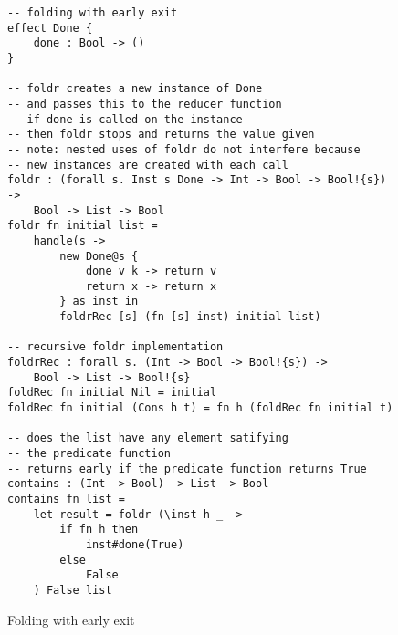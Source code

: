 \begin{figure}[h]
\caption{Folding with early exit}
\begin{verbatim}
-- folding with early exit
effect Done {
	done : Bool -> ()
}

-- foldr creates a new instance of Done
-- and passes this to the reducer function
-- if done is called on the instance
-- then foldr stops and returns the value given
-- note: nested uses of foldr do not interfere because
-- new instances are created with each call
foldr : (forall s. Inst s Done -> Int -> Bool -> Bool!{s}) ->
	Bool -> List -> Bool
foldr fn initial list =
	handle(s ->
		new Done@s {
			done v k -> return v
			return x -> return x
		} as inst in
		foldrRec [s] (fn [s] inst) initial list)

-- recursive foldr implementation
foldrRec : forall s. (Int -> Bool -> Bool!{s}) ->
	Bool -> List -> Bool!{s}
foldRec fn initial Nil = initial
foldRec fn initial (Cons h t) = fn h (foldRec fn initial t)

-- does the list have any element satifying
-- the predicate function
-- returns early if the predicate function returns True
contains : (Int -> Bool) -> List -> Bool
contains fn list =
	let result = foldr (\inst h _ ->
		if fn h then
			inst#done(True)
		else
			False
	) False list
\end{verbatim}
\label{fig:localeffects}
\end{figure}
